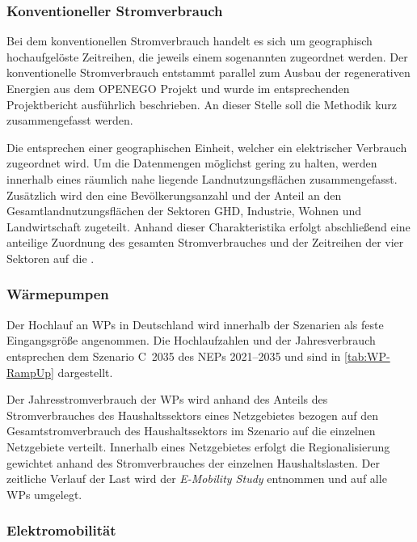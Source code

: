 \subsubsection{Konventioneller Stromverbrauch}

Bei dem konventionellen Stromverbrauch handelt es sich um geographisch hochaufgelöste Zeitreihen, die jeweils einem sogenannten \Lastgebiet zugeordnet werden.
Der konventionelle Stromverbrauch entstammt parallel zum Ausbau der regenerativen Energien aus dem \gls{OPENEGO} Projekt und wurde im entsprechenden Projektbericht \cite{Mueller2019} ausführlich beschrieben.
An dieser Stelle soll die Methodik kurz zusammengefasst werden.\medskip

Die \Lastgebiete entsprechen einer geographischen Einheit, welcher ein elektrischer Verbrauch zugeordnet wird.
Um die Datenmengen möglichst gering zu halten, werden innerhalb eines \Lastgebietes räumlich nahe liegende Landnutzungsflächen zusammengefasst.
Zusätzlich wird den \Lastgebieten eine Bevölkerungsanzahl und der Anteil an den Gesamtlandnutzungsflächen der Sektoren \gls{GHD}, Industrie, Wohnen und Landwirtschaft zugeteilt.
Anhand dieser Charakteristika erfolgt abschließend eine anteilige Zuordnung des gesamten Stromverbrauches und der Zeitreihen der vier Sektoren auf die \Lastgebietedot.


\subsubsection{Wärmepumpen}

Der Hochlauf an \glspl{WP} in Deutschland wird innerhalb der Szenarien als feste Eingangsgröße angenommen.
Die Hochlaufzahlen und der Jahresverbrauch entsprechen dem Szenario C~\num{2035} des \glspl{NEP} \numrange[range-phrase=~{--}~]{2021}{2035} \cite{BNetzA2020} und sind in \autoref{tab:WP-RampUp} dargestellt.



Der Jahresstromverbrauch der \glspl{WP} wird anhand des Anteils des Stromverbrauches des Haushaltssektors eines Netzgebietes bezogen auf den Gesamtstromverbrauch des Haushaltssektors im Szenario \ego auf die einzelnen Netzgebiete verteilt.
Innerhalb eines Netzgebietes erfolgt die Regionalisierung gewichtet anhand des Stromverbrauches der einzelnen Haushaltslasten.
Der zeitliche Verlauf der Last wird der \textit{E-Mobility Study} \cite{Schachler} entnommen und auf alle \glspl{WP} umgelegt.


\subsubsection{Elektromobilität}\label{chap:EMob_Szenarien}


